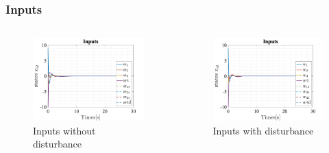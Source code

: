 \documentclass{beamer}
\begin{document}
\begin{frame}
    \frametitle{Inputs}

    \begin{columns}

        \begin{figure}[h]
            \centering
            \includegraphics[width=1\textwidth]{Inputs_T_LQR.jpg}
            \caption{Inputs without disturbance}
        \end{figure}

        \begin{figure}[h]
            \centering
            \includegraphics[width=1\textwidth]{Inputs_T_LQR_Dist.jpg}
            \caption{Inputs with disturbance}
        \end{figure}
    \end{columns}
\end{frame}
\end{document}
